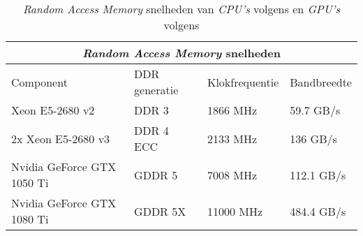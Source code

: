 \begin{table}[b]
    \begin{tabular}{ |p{5.3cm}|p{2.9cm}|p{3.0cm}|p{2.7cm}|  }
        \hline
        \multicolumn{4}{|c|}{\textit{Random Access Memory} snelheden} \\
        \hline
        Component& DDR generatie & Klokfrequentie & Bandbreedte \\
        \hline
            Xeon E5-2680 v2             & DDR 3     & 1866 MHz  & 59.7 GB/s \\
            2x Xeon E5-2680 v3          & DDR 4 ECC & 2133 MHz  & 136 GB/s  \\
            Nvidia GeForce GTX 1050 Ti  & GDDR 5    & 7008 MHz  & 112.1 GB/s\\
            Nvidia GeForce GTX 1080 Ti  & GDDR 5X   & 11000 MHz & 484.4 GB/s\\
        \hline
    \end{tabular}
    \caption[Verschillen in RAM snelheden voor \textit{CPU's} en \textit{GPU's}~\autocite{Intel2013,Intel2014,TechPowerUp2016, TechPowerUp2017}]{\textit{Random Access Memory} snelheden van \textit{CPU's} volgens \textcite{Intel2013,Intel2014} en \textit{GPU's} volgens \textcite{TechPowerUp2016, TechPowerUp2017}}
    \label{tab:RAMSpeeds}
\end{table}
